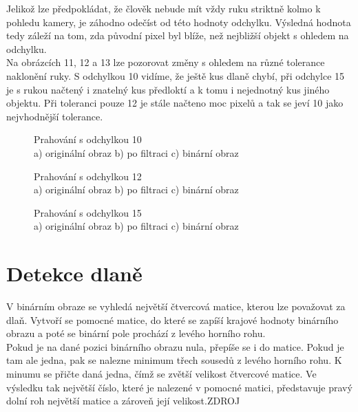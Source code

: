 Jelikož lze předpokládat, že člověk nebude mít vždy ruku striktně kolmo k pohledu kamery, je záhodno odečíst od této hodnoty odchylku. Výsledná hodnota tedy záleží na tom, zda původní pixel byl blíže, než nejbližší objekt s ohledem na odchylku.\\
Na obrázcích 11, 12 a 13 lze pozorovat změny s ohledem na různé tolerance naklonění ruky. S odchylkou 10 vidíme, že ještě kus dlaně chybí, při odchylce 15 je s rukou načtený i znatelný kus předloktí a k tomu i nejednotný kus jiného objektu. Při toleranci pouze 12 je stále načteno moc pixelů a tak se jeví 10 jako nejvhodnější tolerance.\\

\begin{figure}[htp]
\centering
{} \hfill
{} \hfill
{}
\caption{Prahování s odchylkou 10 \\ a) originální obraz b) po filtraci c) binární obraz}
\label{fig:tresh10}
\end{figure}
\begin{figure}[htp]
\centering
{} \hfill
{} \hfill
{}
\caption{Prahování s odchylkou 12 \\ a) originální obraz b) po filtraci c) binární obraz}
\label{fig:tresh11}
\end{figure}
\begin{figure}[htp]
\centering
{} \hfill
{} \hfill
{}
\caption{Prahování s odchylkou 15 \\ a) originální obraz b) po filtraci c) binární obraz}
\label{fig:tresh12}
\end{figure}

\section{Detekce dlaně}
V binárním obraze se vyhledá největší čtvercová matice, kterou lze považovat za dlaň. Vytvoří se pomocné matice, do které se zapíší krajové hodnoty binárního obrazu a poté se binární pole prochází z levého horního rohu.\\
Pokud je na dané pozici binárního obrazu nula, přepíše se i do matice. Pokud je tam ale jedna, pak se nalezne minimum třech sousedů z levého horního rohu. K minumu se přičte daná jedna, čímž se zvětší velikost čtvercové matice. Ve výsledku tak největší číslo, které je nalezené v pomocné matici, představuje pravý dolní roh největší matice a zároveň její velikost.ZDROJ


\endinput
